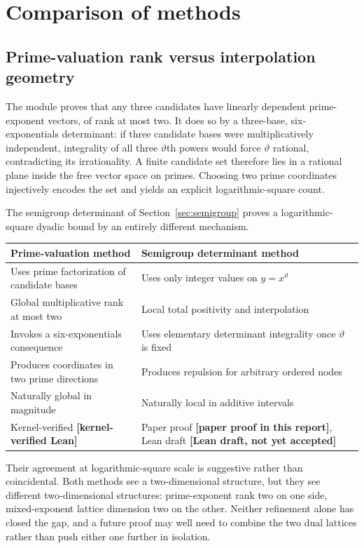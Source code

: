 \documentclass[11pt,oneside]{article}
\theoremstyle{definition}
\theoremstyle{remark}
\newcommand{\thetaq}{\vartheta}
\newcommand{\lean}[1]{\texttt{\detokenize{#1}}}
\newcommand{\statuslean}{\textcolor{leanblue}{\textbf{[kernel-verified Lean]}}}
\newcommand{\statusnew}{\textcolor{newgreen}{\textbf{[paper proof in this report]}}}
\newcommand{\statusdraft}{\textcolor{computeviolet}{\textbf{[Lean draft, not yet accepted]}}}
\begin{document}
\section{Comparison of methods}
\label{sec:comparison}

\subsection{Prime-valuation rank versus interpolation geometry}
\label{bp:rank-vs-geometry}

The module \lean{MultiplicativeRank} proves that any three candidates have linearly dependent
prime-exponent vectors, of rank at most two.  It does so by a three-base, six-exponentials
determinant: if three candidate bases were multiplicatively independent, integrality of all
three $\thetaq$th powers would force $\thetaq$ rational, contradicting its irrationality.  A
finite candidate set therefore lies in a rational plane inside the free vector space on
primes.  Choosing two prime coordinates injectively encodes the set and yields an explicit
logarithmic-square count.

The semigroup determinant of Section~\ref{sec:semigroup} proves a logarithmic-square dyadic
bound by an entirely different mechanism.

\begin{center}
\begin{tabular}{p{}p{}}
\toprule
Prime-valuation method & Semigroup determinant method \\
\midrule
Uses prime factorization of candidate bases & Uses only integer values on $y=x^{\thetaq}$ \\
Global multiplicative rank at most two & Local total positivity and interpolation \\
Invokes a six-exponentials consequence & Uses elementary determinant integrality once
$\thetaq$ is fixed \\
Produces coordinates in two prime directions & Produces repulsion for arbitrary ordered
nodes \\
Naturally global in magnitude & Naturally local in additive intervals \\
Kernel-verified \statuslean{} & Paper proof \statusnew{}, Lean draft \statusdraft{} \\
\bottomrule
\end{tabular}
\end{center}

Their agreement at logarithmic-square scale is suggestive rather than coincidental.  Both
methods see a two-dimensional structure, but they see different two-dimensional structures:
prime-exponent rank two on one side, mixed-exponent lattice dimension two on the other.
Neither refinement alone has closed the gap, and a future proof may well need to combine the
two dual lattices rather than push either one further in isolation.
\end{document}
